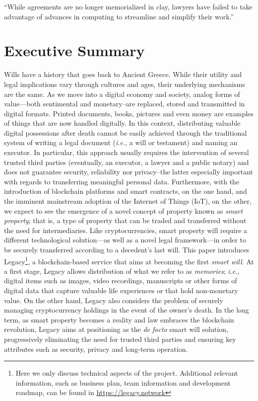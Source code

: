 \begin{savequote}[0.55\linewidth]
	``While agreements are no longer memorialized in clay, lawyers have failed to take advantage of advances in computing to streamline and simplify their work.''
\end{savequote}

\chapter{Executive Summary} %
\label{cha:executive_summary}

Wills have a history that goes back to Ancient Greece. While their utility and legal implications vary through cultures and ages, their underlying mechanisms are the same. As we move into a digital economy and society, analog forms of value---both sentimental and monetary--are replaced, stored and transmitted in digital formats. Printed documents, books, pictures and even money are examples of things that are now handled digitally. In this context, distributing valuable digital possessions after death cannot be easily achieved through the traditional system of writing a legal document (\textit{i.e.}, a will or testament) and naming an executor. In particular, this approach usually requires the intervention of several trusted third parties (eventually, an executor, a lawyer and a public notary) and does not guarantee security, reliability nor privacy--the latter especially important with regards to transferring meaningful personal data. Furthermore, with the introduction of blockchain platforms and smart contracts, on the one hand, and the imminent mainstream adoption of the Internet of Things (IoT), on the other, we expect to see the emergence of a novel concept of property known as \textit{smart property}; that is, a type of property that can be traded and transferred without the need for intermediaries. Like cryptocurrencies, smart property will require a different technological solution---as well as a novel legal framework---in order to be securely transferred according to a decedent's last will.
This paper introduces Legacy\footnote{Here we only discuss technical aspects of the project. Additional relevant information, such as business plan, team information and development roadmap, can be found in \url{https://legacy.network}}, a blockchain-based service that aims at becoming the first \textit{smart will}. At a first stage, Legacy allows distribution of what we refer to as \textit{memories}; \textit{i.e.}, digital items such as images, video recordings, manuscripts or other forms of digital data that capture valuable life experiences or that hold non-monetary value.
On the other hand, Legacy also considers the problem of securely managing cryptocurrency holdings in the event of the owner's death. 
In the long term, as smart property becomes a reality and law embraces the blockchain revolution, Legacy aims at positioning as the \textit{de facto} smart will solution, progressively eliminating the need for trusted third parties and ensuring key attributes such as security, privacy and long-term operation.

